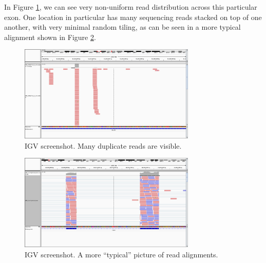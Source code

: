\documentclass{article}
\begin{document}
In Figure \ref{fig:igv_dups}, we can see very non-uniform read distribution across this particular exon.  One location in particular has many sequencing reads stacked on top of one another, with very minimal random tiling, as can be seen in a more typical alignment shown in Figure \ref{fig:igv_typical}.

\begin{figure}[ht!]
  \centering
    \includegraphics[width=0.75\textwidth]{igv_duplicates}
    \caption{IGV screenshot.  Many duplicate reads are visible.}
     \label{fig:igv_dups}
\end{figure}

\begin{figure}[ht!]
  \centering
    \includegraphics[width=0.75\textwidth]{igv_typical}
    \caption{IGV screenshot.  A more ``typical'' picture of read alignments.}
     \label{fig:igv_typical}
\end{figure}






\newpage
\appendix
\end{document}
